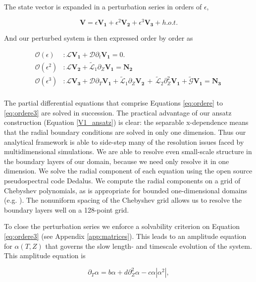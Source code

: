 \documentclass{emulateapj}
\newcommand{\beq}{\begin{equation}}
\newcommand{\eeq}{\end{equation}}
\newcommand{\citei}[1]{\citeauthor{#1} \citeyear{#1}}
\begin{document}
The state vector is expanded in a perturbation series in orders of $\epsilon$,

\beq
\label{eq:pert_exp}
\mathbf{V} = \epsilon\mathbf{V_1} + \epsilon^2\mathbf{V_2} + \epsilon^3\mathbf{V_3} + h.o.t.
\eeq

And our perturbed system is then expressed order by order as

\begin{align}
\mathcal{O}(\epsilon)&: \mathcal{L}\mathbf{V_1} + \mathcal{D}\partial_t \mathbf{V_1} = 0. \\ \label{eq:ordere}
\mathcal{O}(\epsilon^2)&: \mathcal{L}\mathbf{V_2} + \widetilde{\mathcal{L}}_1 \partial_Z \mathbf{V_1} = \mathbf{N_2}\\
\mathcal{O}(\epsilon^3)&: \mathcal{L} \mathbf{V_3} + \mathcal{D}\partial_T \mathbf{V_1}  + \widetilde{\mathcal{L}}_1\partial_Z\mathbf{V_2} \, + \, \widetilde{\mathcal{L}}_2\partial_Z^2\mathbf{V_1} + \widetilde{\mathcal{G}}\mathbf{V_1} = \mathbf{N_3} \, \\ \label{eq:ordere3}
\end{align}

The partial differential equations that comprise Equations \ref{eq:ordere} to \ref{eq:ordere3} are solved in succession. The practical advantage of our ansatz construction (Equation \ref{V1_ansatz}) is clear: the separable x-dependence means that the radial boundary conditions are solved in only one dimension. Thus our analytical framework is able to side-step many of the resolution issues faced by multidimensional simulations. We are able to resolve even small-scale structure in the boundary layers of our domain, because we need only resolve it in one dimension. We solve the radial component of each equation using the open source pseudospectral code Dedalus. We compute the radial components on a grid of Chebyshev polynomials, as is appropriate for bounded one-dimensional domains (e.g. \citei{Boyd:2001aa}). The nonuniform spacing of the Chebyshev grid allows us to resolve the boundary layers well on a 128-point grid.

To close the perturbation series we enforce a solvability criterion on Equation \ref{eq:ordere3} (see Appendix \ref{app:matrices}). This leads to an amplitude equation for $\alpha(T, Z)$ that governs the slow length- and timescale evolution of the system. This amplitude equation is 

\beq
\label{eq:gle}
\partial_T \alpha = b \alpha + d \partial_Z^2 \alpha - c \alpha \left|\alpha^2\right|,
\eeq
\end{document}
